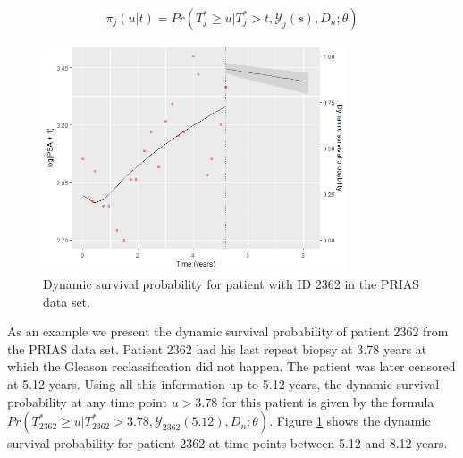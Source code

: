\begin{equation}
\pi_j(u|t) = Pr(T^*_j \geq u| T^*_j >t, \mathcal{Y}_j(s), D_n; \theta)
\end{equation}

\begin{figure}[!htb]
	\centering
    \captionsetup{justification=centering}
	\includegraphics[width=0.8\textwidth]{dyn_surv_prob_2362.png}
	\caption{Dynamic survival probability for patient with ID 2362 in the PRIAS data set.}
	\label{fig : dyn_surv_prob_2362}
\end{figure}

As an example we present the dynamic survival probability of patient 2362 from the PRIAS data set. Patient 2362 had his last repeat biopsy at 3.78 years at which the Gleason reclassification did not happen. The patient was later censored at 5.12 years. Using all this information up to 5.12 years, the dynamic survival probability at any time point $u > 3.78$ for this patient is given by the formula $Pr(T^*_{2362} \geq u| T^*_{2362} > 3.78, \mathcal{Y}_{2362}(5.12), D_n; \theta)$. Figure \ref{fig : dyn_surv_prob_2362} shows the dynamic survival probability for patient 2362 at time points between 5.12 and 8.12 years.